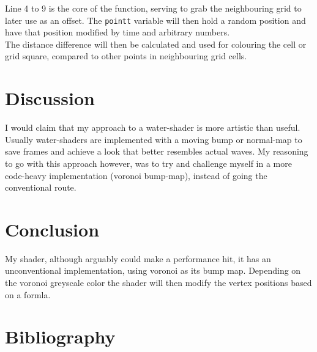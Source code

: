 \documentclass{article}
\begin{document}
Line 4 to 9 is the core of the function, serving to grab the neighbouring grid to later use as an offset. The \texttt{pointt} variable will then hold a random position and have that position modified by time and arbitrary numbers.\\The distance difference will then be calculated and used for colouring the cell or grid square, compared to other points in neighbouring grid cells.

\section{Discussion}
\label{sec:discussion}
I would claim that my approach to a water-shader is more artistic than useful. Usually water-shaders are implemented with a moving bump or normal-map to save frames and achieve a look that better resembles actual waves. My reasoning to go with this approach however, was to try and challenge myself in a more code-heavy implementation (voronoi bump-map), instead of going the conventional route.

\section{Conclusion}
\label{sec:conclusion}
My shader, although arguably could make a performance hit, it has an unconventional implementation, using voronoi as its bump map. Depending on the voronoi greyscale color the shader will then modify the vertex positions based on a formla.


\newpage
\section{Bibliography}
\printbibliography
\end{document}
